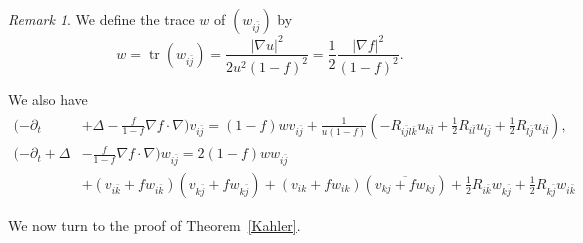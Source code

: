 \documentclass{amsart}
\theoremstyle{definition}
\theoremstyle{remark}
\newtheorem{remark}[theorem]{Remark}
\numberwithin{equation}{section}
\begin{document}
\begin{remark}
  We define the trace $w$ of $\left(w_{i \bar{j}}\right)$ by
  \[
  w=\operatorname{tr}\left(w_{i \bar{j}}\right)= \frac{|\nabla u|^2}{2u^2(1-f)^2}=\frac{1}{2}\frac{|\nabla f|^{2}}{(1-f)^{2}} .
  \]

  We also have
  \[
    \begin{aligned}
      (-\partial_t &+ \Delta-\frac{f}{1-f} \nabla f \cdot \nabla) v_{i \bar{j}} = (1-f) w v_{i \bar{j}}+\frac{1}{u(1-f)}(-R_{i \bar{j} l \bar{k}} u_{k \bar{l}}+\frac{1}{2} R_{i \bar{l}} u_{l\bar{j}}+\frac{1}{2} R_{l \bar{j}} u_{i \bar{l}}), \\
      (-\partial_t + \Delta & -\frac{f}{1-f} \nabla f \cdot \nabla ) w_{i \bar{j}} = 2(1-f) w w_{i \bar{j}}\\
&+\left(v_{i \bar{k}}+f w_{i \bar{k}}\right)\left(v_{k \bar{j}} + f w_{k \bar{j}}\right) +\left(v_{i k}+f w_{i k}\right)\left(\overline{v_{k j}+f w_{k j}}\right)+ \frac{1}{2} R_{i \bar{k}} w_{k \bar{j}}+\frac{1}{2} R_{k \bar{j}} w_{i \bar{k}}
    \end{aligned}
  \]
\end{remark}

We now turn to the proof of Theorem~\ref{Kahler}.
\end{document}
